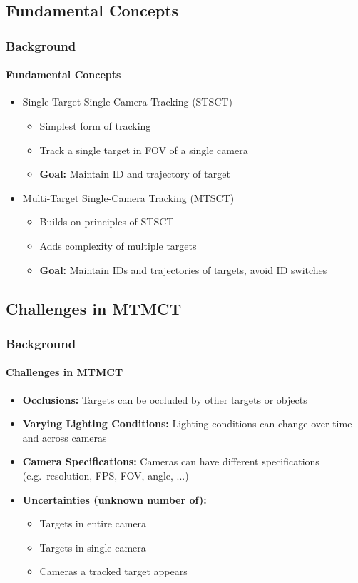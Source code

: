\subsection{Fundamental Concepts}
\begin{frame}
	\frametitle{Background}
	\framesubtitle{Fundamental Concepts}

	\begin{itemize}
		\item <1->Single-Target Single-Camera Tracking (STSCT)
		      \begin{itemize}
			      \item Simplest form of tracking
			      \item Track a single target in FOV of a single camera
			      \item \textbf{Goal:} Maintain ID and trajectory of target
		      \end{itemize}
		      \vspace{5pt}
		\item <2->Multi-Target Single-Camera Tracking (MTSCT)
		      \begin{itemize}
			      \item Builds on principles of STSCT
			      \item Adds complexity of multiple targets
			      \item \textbf{Goal:} Maintain IDs and trajectories of targets, avoid ID switches
		      \end{itemize}
	\end{itemize}
\end{frame}

\subsection{Challenges in MTMCT}
\begin{frame}
	\frametitle{Background}
	\framesubtitle{Challenges in MTMCT}

	\begin{itemize}
		\item <1->\textbf{Occlusions:} Targets can be occluded by other targets or objects
		      \vspace{5pt}
		\item <2->\textbf{Varying Lighting Conditions:} Lighting conditions can change over time and across cameras
		      \vspace{5pt}
		\item <3->\textbf{Camera Specifications:} Cameras can have different specifications (e.g.~resolution, FPS, FOV, angle, ...)
		      \vspace{5pt}
		\item <4->\textbf{Uncertainties (unknown number of):}
		      \begin{itemize}
			      \item Targets in entire camera
			      \item Targets in single camera
			      \item Cameras a tracked target appears
		      \end{itemize}
	\end{itemize}
\end{frame}

